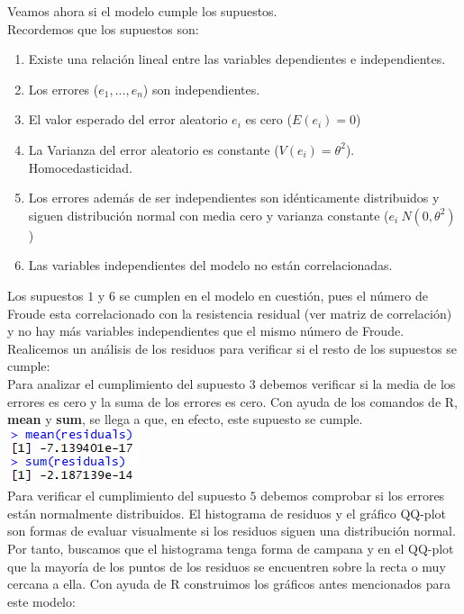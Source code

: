 \documentclass[twoside]{article}
\begin{document}
\begin{multicols}{2}
Veamos ahora si el modelo cumple los supuestos.\\
Recordemos que los supuestos son:
\begin{enumerate}
\item Existe una relaci\'on lineal entre las variables dependientes e independientes.
\item Los errores ($e_1,...,e_n$) son independientes.
\item El valor esperado del error aleatorio $e_i$ es cero ($E(e_i) = 0$)
\item La Varianza del error aleatorio es constante ($V(e_i) = \theta^2$). Homocedasticidad.
\item Los errores adem\'as de ser independientes son id\'enticamente distribuidos y siguen distribuci\'on normal con media cero y varianza constante ($e_i ~ N(0, \theta^2)$)
\item Las variables independientes del modelo no est\'an correlacionadas.
\end{enumerate}

Los supuestos $1$ y $6$ se cumplen en el modelo en cuesti\'on, pues el n\'umero de Froude esta correlacionado con la resistencia residual (ver matriz de correlaci\'on) y no hay m\'as variables independientes que el mismo n\'umero de Froude.\\
Realicemos un an\'alisis de los residuos para verificar si el resto de los supuestos se cumple:\\

Para analizar el cumplimiento del supuesto $3$ debemos verificar si la media de los errores es cero y la suma de los errores es cero. Con ayuda de los comandos de R, \textbf{mean} y \textbf{sum}, se llega a que, en efecto, este supuesto se cumple.\\

\includegraphics[scale = 0.7]{images/pic_04.png} \\

Para verificar el cumplimiento del supuesto $5$ debemos comprobar si los errores est\'an normalmente distribuidos. El histograma de residuos y el gr\'afico QQ-plot son formas de evaluar visualmente si los residuos siguen una distribuci\'on normal. Por tanto, buscamos que el histograma tenga forma de campana y en el QQ-plot que la mayor\'ia de los puntos de los residuos se encuentren sobre la recta o muy cercana a ella. Con ayuda de R construimos los gr\'aficos antes mencionados para este modelo:\\


\end{multicols}
\end{document}
